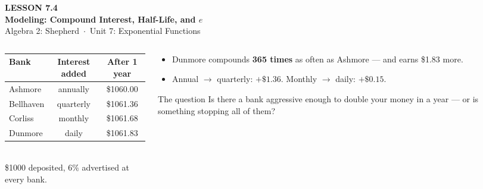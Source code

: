 \documentclass[aspectratio=169, 11pt]{beamer}
\begin{document}
{
\begin{frame}[plain]
  \vspace{2.8cm}\hspace{0.55cm}%
  \begin{minipage}{0.9\textwidth}
    {\color{goldacc}\bfseries\small LESSON 7.4}\\[0.5cm]
    {\color{white}\bfseries\LARGE Modeling: Compound Interest, Half-Life, and $e$}\\[1.2cm]
    {\color{forestmid}\small Algebra 2: Shepherd~$\cdot$~Unit 7: Exponential Functions}
  \end{minipage}
\end{frame}
}

\begin{frame}[t, plain]
  \begin{columns}[T]
    \begin{column}{0.52\textwidth}
      \footnotesize
      \renewcommand{\arraystretch}{1.35}
      \begin{tabular}{|l|c|c|}
      \hline
      \textbf{Bank} & \textbf{Interest added} & \textbf{After 1 year} \\
      \hline
      Ashmore   & annually  & \$1060.00 \\
      Bellhaven & quarterly & \$1061.36 \\
      Corliss   & monthly   & \$1061.68 \\
      Dunmore   & daily     & \$1061.83 \\
      \hline
      \end{tabular}
      \\[6pt]
      {\scriptsize \$1000 deposited, $6\%$ advertised at every bank.}
    \end{column}
    \begin{column}{0.44\textwidth}
      \footnotesize
      \begin{itemize}\setlength{\itemsep}{4pt}
        \item Dunmore compounds \textbf{365 times} as often as Ashmore --- and earns \$1.83 more.
        \item Annual $\to$ quarterly: $+\$1.36$. Monthly $\to$ daily: $+\$0.15$.
      \end{itemize}
      \vspace{3pt}
      \begin{block}{The question}
        Is there a bank aggressive enough to double your money in a year --- or is something stopping
        all of them?
      \end{block}
    \end{column}
  \end{columns}
\end{frame}
\end{document}
